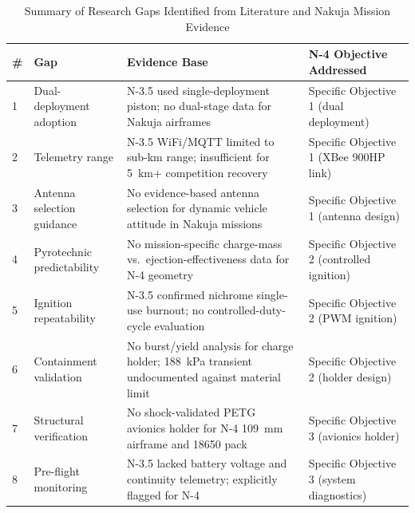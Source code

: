 \begin{table}[htbp]
\centering
\caption{Summary of Research Gaps Identified from Literature and Nakuja Mission Evidence}
\label{tab:gaps}
\small
\renewcommand{\arraystretch}{1.2}
\begin{tabular}{@{}p{0.4cm}|p{3.4cm}|p{4.2cm}|p{3.6cm}@{}}
\toprule
\rowcolor{gray!22}\textbf{\#} & \textbf{Gap} & \textbf{Evidence Base} & \textbf{N-4 Objective Addressed} \\ \midrule
1 & Dual-deployment adoption & N-3.5 used single-deployment piston; no dual-stage data for Nakuja airframes \cite{n3p5_recovery_report} & Specific Objective 1 (dual deployment) \\ \hline
2 & Telemetry range & N-3.5 WiFi/MQTT limited to sub-km range; insufficient for 5~km+ competition recovery \cite{n3p5_recovery_report} & Specific Objective 1 (XBee 900HP link) \\ \hline
3 & Antenna selection guidance & No evidence-based antenna selection for dynamic vehicle attitude in Nakuja missions \cite{arrl_antenna_book} & Specific Objective 1 (antenna design) \\ \hline
4 & Pyrotechnic predictability & No mission-specific charge-mass vs.\ ejection-effectiveness data for N-4 geometry \cite{n4_poptest_internal} & Specific Objective 2 (controlled ignition) \\ \hline
5 & Ignition repeatability & N-3.5 confirmed nichrome single-use burnout; no controlled-duty-cycle evaluation \cite{n3p5_recovery_report, nichrome_ignition} & Specific Objective 2 (PWM ignition) \\ \hline
6 & Containment validation & No burst/yield analysis for charge holder; 188~kPa transient undocumented against material limit \cite{n4_poptest_internal} & Specific Objective 2 (holder design) \\ \hline
7 & Structural verification & No shock-validated PETG avionics holder for N-4 109~mm airframe and 18650 pack \cite{petg_mechanical, n4_poptest_internal} & Specific Objective 3 (avionics holder) \\ \hline
8 & Pre-flight monitoring & N-3.5 lacked battery voltage and continuity telemetry; explicitly flagged for N-4 \cite{n3p5_recovery_report} & Specific Objective 3 (system diagnostics) \\ \bottomrule
\end{tabular}
\end{table}